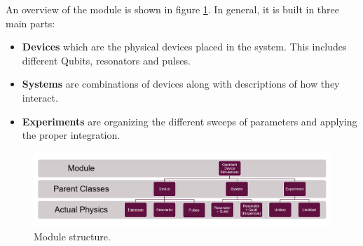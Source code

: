 An overview of the module is shown in figure \ref{fig:module_overview}. In general, it is built in three main parts:
\begin{itemize}
    \item \textbf{Devices} which are the physical devices placed in the system. This includes different Qubits, resonators and pulses.
    \item \textbf{Systems} are combinations of devices along with descriptions of how they interact.
    \item \textbf{Experiments} are organizing the different sweeps of parameters and applying the proper integration. 
\end{itemize}

\begin{figure}
    \centering
    \includegraphics{Figs/Sections/Introduction/module.png}
    \caption{Module structure.}
    \label{fig:module_overview}
\end{figure}
